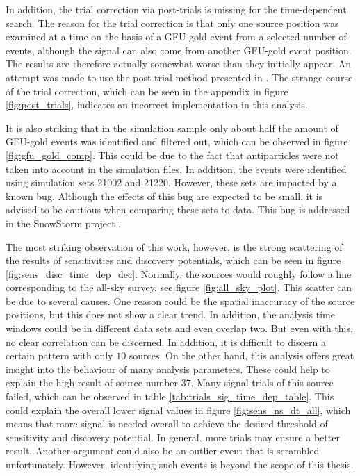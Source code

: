 In addition, the trial correction via post-trials is missing for the time-dependent search.
The reason for the trial correction is that only one source position was examined at a time on the basis of a GFU-gold event from a selected number of events, although the signal can also come from another GFU-gold event position.
The results are therefore actually somewhat worse than they initially appear.
An attempt was made to use the post-trial method presented in \cite{thorben}.
The strange course of the trial correction, which can be seen in the appendix in figure \ref{fig:post_trials}, indicates an incorrect implementation in this analysis.

It is also striking that in the simulation sample only about half the amount of GFU-gold events was identified and filtered out, which can be observed in figure \ref{fig:gfu_gold_comp}.
This could be due to the fact that antiparticles were not taken into account in the simulation files.
In addition, the events were identified using simulation sets 21002 and 21220.
However, these sets are impacted by a known bug.
Although the effects of this bug are expected to be small, it is advised to be cautious when comparing these sets to data.
This bug is addressed in the SnowStorm project \cite{snowstorm}.

The most striking observation of this work, however, is the strong scattering of the results of sensitivities and discovery potentials, which can be seen in figure \ref{fig:sens_disc_time_dep_dec}.
Normally, the sources would roughly follow a line corresponding to the all-sky survey, see figure \ref{fig:all_sky_plot}.
This scatter can be due to several causes.
One reason could be the spatial inaccuracy of the source positions, but this does not show a clear trend.
In addition, the analysis time windows could be in different data sets and even overlap two.
But even with this, no clear correlation can be discerned.
In addition, it is difficult to discern a certain pattern with only $\num{10}$ sources.
On the other hand, this analysis offers great insight into the behaviour of many analysis parameters.
These could help to explain the high result of source number $\num{37}$.
Many signal trials of this source failed, which can be observed in table \ref{tab:trials_sig_time_dep_table}.
This could explain the overall lower signal values in figure \ref{fig:sens_ns_dt_all}, which means that more signal is needed overall to achieve the desired threshold of sensitivity and discovery potential.
In general, more trials may ensure a better result.
Another argument could also be an outlier event that is scrambled unfortunately.
However, identifying such events is beyond the scope of this thesis.

